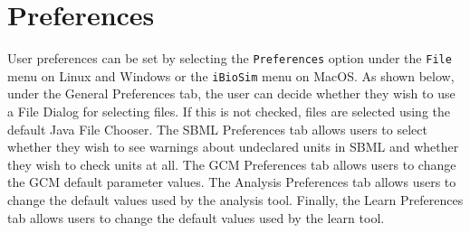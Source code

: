 \documentclass[titlepage,11pt]{article}
\begin{document}
\clearpage

\section{\label{Preferences}Preferences}

\noindent
User preferences can be set by selecting the {\tt Preferences} option
under the {\tt File} menu on Linux and Windows or the {\tt iBioSim} 
menu on MacOS.  As shown below, under the General Preferences tab, the
user can decide whether they wish to use a File Dialog for selecting
files.  If this is not checked, files are selected using the default
Java File Chooser.  The SBML Preferences tab allows users to select
whether they wish to see warnings about undeclared units in SBML and
whether they wish to check units at all.  The GCM Preferences tab
allows users to change the GCM default parameter values.  The Analysis
Preferences tab allows users to change the default values used by the
analysis tool.  Finally, the Learn Preferences tab allows users to
change the default values used by the learn tool.
\end{document}
